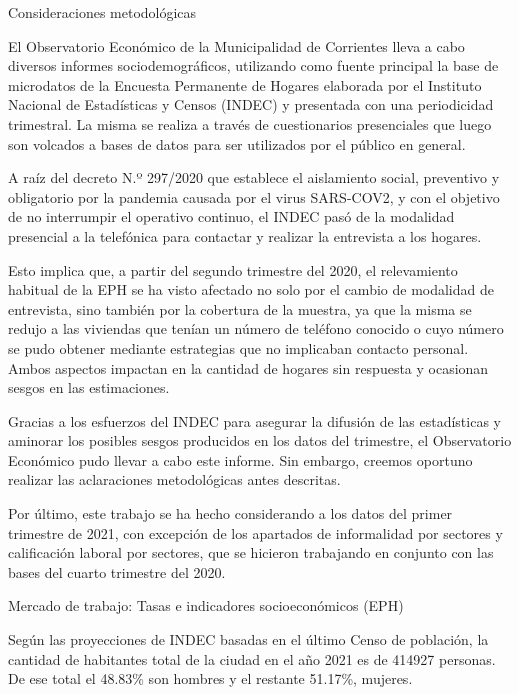 \documentclass{article}
\author{}
\date{}
\begin{document}
\textcolor{graycustom}{\Large Consideraciones metodológicas} \newline

El Observatorio Económico de la Municipalidad de Corrientes lleva a cabo
diversos informes sociodemográficos, utilizando como fuente principal la
base de microdatos de la Encuesta Permanente de Hogares elaborada por el
Instituto Nacional de Estadísticas y Censos (INDEC) y presentada con una
periodicidad trimestral. La misma se realiza a través de cuestionarios
presenciales que luego son volcados a bases de datos para ser utilizados
por el público en general.

A raíz del decreto N.º 297/2020 que establece el aislamiento social,
preventivo y obligatorio por la pandemia causada por el virus SARS-COV2,
y con el objetivo de no interrumpir el operativo continuo, el INDEC pasó
de la modalidad presencial a la telefónica para contactar y realizar la
entrevista a los hogares.

Esto implica que, a partir del segundo trimestre del 2020, el
relevamiento habitual de la EPH se ha visto afectado no solo por el
cambio de modalidad de entrevista, sino también por la cobertura de la
muestra, ya que la misma se redujo a las viviendas que tenían un número
de teléfono conocido o cuyo número se pudo obtener mediante estrategias
que no implicaban contacto personal. Ambos aspectos impactan en la
cantidad de hogares sin respuesta y ocasionan sesgos en las
estimaciones.

Gracias a los esfuerzos del INDEC para asegurar la difusión de las
estadísticas y aminorar los posibles sesgos producidos en los datos del
trimestre, el Observatorio Económico pudo llevar a cabo este informe.
Sin embargo, creemos oportuno realizar las aclaraciones metodológicas
antes descritas.

Por último, este trabajo se ha hecho considerando a los datos del primer
trimestre de 2021, con excepción de los apartados de informalidad por
sectores y calificación laboral por sectores, que se hicieron trabajando
en conjunto con las bases del cuarto trimestre del 2020.

\newpage

\textcolor{graycustom}{\Large Mercado de trabajo: 
Tasas e indicadores socioeconómicos (EPH)} \newline

Según las proyecciones de INDEC basadas en el último Censo de población,
la cantidad de habitantes total de la ciudad en el año 2021 es de 414927
personas. De ese total el 48.83\% son hombres y el restante 51.17\%,
mujeres.
\end{document}

